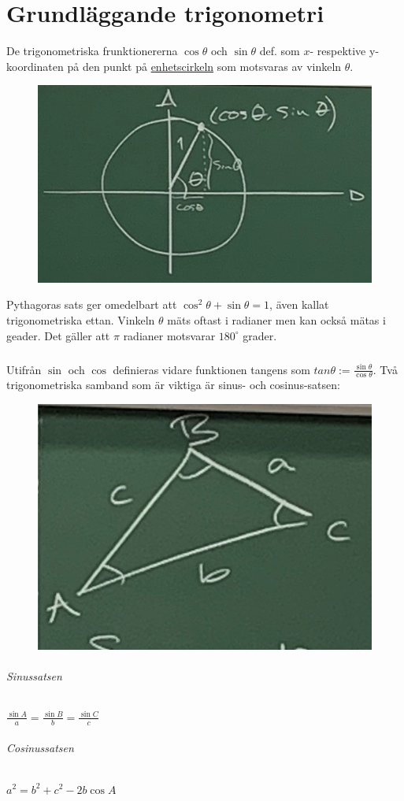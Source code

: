 \chapter{Grundläggande trigonometri}
De trigonometriska frunktionererna $\cos\theta$ och $\sin\theta$ def. som $x$- respektive y-koordinaten på den punkt på \underline{enhetscirkeln} som motsvaras av vinkeln $\theta$.
\begin{figure}[h!]
    \centering
    \includegraphics[scale=0.2]{lessons/lesson02/imgs/img02.jpg}
\end{figure}
Pythagoras sats ger omedelbart att $\cos^2\theta+\sin\theta=1$, även kallat trigonometriska ettan.
Vinkeln $\theta$ mäts oftast i radianer men kan också mätas i geader.
Det gäller att $\pi$ radianer motsvarar $180^\circ$ grader.

\paragraph{}Utifrån $\sin$ och $\cos$ definieras vidare funktionen tangens som $tan\theta:=\frac{\sin\theta}{\cos\theta}$.
Två trigonometriska samband som är viktiga är sinus- och cosinus-satsen:
\begin{figure}[h!]
    \centering
    \includegraphics[scale=0.1]{lessons/lesson02/imgs/img03.jpg}
\end{figure}
\subparagraph{Sinussatsen} $\frac{\sin A}{a}=\frac{\sin B}{b}=\frac{\sin C}{c}$
\subparagraph{Cosinussatsen} $a^2=b^2+c^2-2b\cos A$

